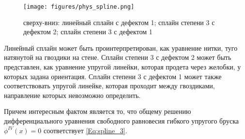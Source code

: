 \begin{figure}[!h]
    \centering
    \texttt{[image: figures/phys\_spline.png]}
    \caption{сверху-вниз: 
    линейный сплайн с дефектом 1; 
    сплайн степени 3 с дефектом 2;
    сплайн степени 3 с дефектом 1
    }
\end{figure}

Линейный сплайн может быть проинтерпретирован, как уравнение нитки, туго натянутой на гвоздики на стене. Сплайн степени 3 с дефектом 2 может быть представлен, как уравнение упругой линейки, которая продета через желобки, у которых задана ориентация. Сплайн степени 3 с дефектом 1 может также соответствовать упругой линейке, которая проходит между гвоздиками, направление которых невозможно определить.

Причем интересным фактом является то, что общему решению дифференциального уравнения свободного равновесия гибкого упругого бруска $\phi^{IV}(x) = 0$ соответствует \eqref{Eq:spline_3}.